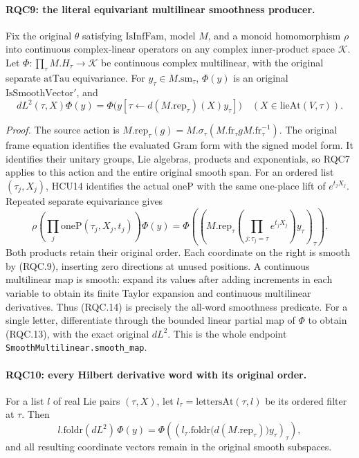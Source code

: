 \documentclass[11pt,a4paper]{article}
\numberwithin{equation}{section}
\theoremstyle{remark}\newtheorem{remark}[theorem]{Remark}
\begin{document}
\paragraph{RQC9: the literal equivariant multilinear smoothness producer.}
\label{claim:RQC9}
Fix the original \(\theta\) satisfying \(\mathrm{IsInfFam}\),
model \(M\), and a monoid homomorphism \(\rho\) into continuous
complex-linear operators on any complex inner-product space
\(\mathcal K\).  Let
\(\Phi:\prod_\tau M.H_\tau\to\mathcal K\) be continuous complex
multilinear, with the original separate \(\mathrm{atTau}\)
equivariance.  For \(y_\tau\in M.\mathrm{sm}_\tau\),
\(\Phi(y)\) is an original \(\mathrm{IsSmoothVector}'\), and
\[
 dL^2(\tau,X)\Phi(y)
 =\Phi\bigl(y[\tau\leftarrow d(M.\mathrm{rep}_\tau)(X)y_\tau]\bigr)
 \quad(X\in\mathrm{lieAt}(V,\tau)).
 \tag{RQC.13}
\]

\emph{Proof.}
The source action is
\(M.\mathrm{rep}_\tau(g)=
 M.\sigma_\tau(M.\mathrm{fr}_\tau gM.\mathrm{fr}_\tau^{-1})\).
The original frame equation identifies the evaluated Gram form
with the signed model form.  It identifies their unitary groups,
Lie algebras, products and exponentials, so RQC7 applies to this
action and the entire original smooth span.
For an ordered list \((\tau_j,X_j)\), HCU14 identifies the actual
\(\mathrm{oneP}\) with the same one-place lift of \(e^{t_jX_j}\).
Repeated separate equivariance gives
\[
 \rho\!\left(\prod_j\mathrm{oneP}(\tau_j,X_j,t_j)\right)\Phi(y)
 =\Phi\left(\left(
 M.\mathrm{rep}_\tau\!\left(
       \prod_{j:\tau_j=\tau}e^{t_jX_j}\right)y_\tau
                         \right)_\tau\right).
 \tag{RQC.14}
\]
Both products retain their original order.  Each coordinate on the
right is smooth by (RQC.9), inserting zero directions at unused
positions.  A continuous multilinear map is smooth: expand its
values after adding increments in each variable to obtain its
finite Taylor expansion and continuous multilinear derivatives.
Thus (RQC.14) is precisely the all-word smoothness predicate.
For a single letter, differentiate through the bounded linear
partial map of \(\Phi\) to obtain (RQC.13), with the exact
original \(dL^2\).  This is the whole endpoint
\texttt{SmoothMultilinear.smooth\_map}.

\paragraph{RQC10: every Hilbert derivative word with its original order.}
\label{claim:RQC10}
For a list \(l\) of real Lie pairs \((\tau,X)\), let
\(l_\tau=\mathrm{lettersAt}(\tau,l)\) be its ordered filter at
\(\tau\).  Then
\[
 l.\mathrm{foldr}(dL^2)\,\Phi(y)=
 \Phi\left(\left(
 l_\tau.\mathrm{foldr}\bigl(d(M.\mathrm{rep}_\tau)\bigr)y_\tau
                         \right)_\tau\right),
 \tag{RQC.15}
\]
and all resulting coordinate vectors remain in the original smooth
subspaces.
\end{document}
